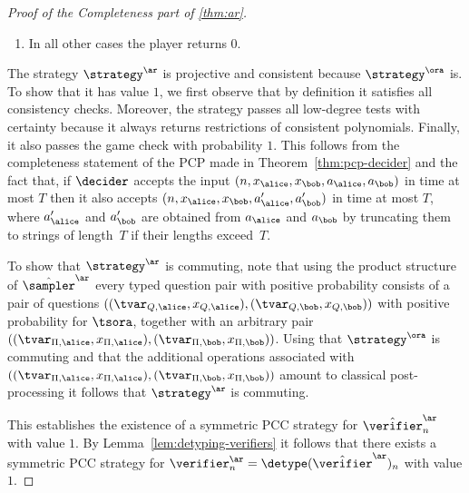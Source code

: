 \begin{proof}[Proof of the Completeness part of \cref{thm:ar}]
\begin{enumerate}
\begin{enumerate}
\begin{enumerate}
        $\DLine_i$ instead of $\ALine_i$) for $i \in \{1, \dots, 5\}$, the
        player returns the restriction of $g_i$ to the axis-parallel line (resp.
        diagonal line) of $\F_q^{m}$ specified by $x_\Pi$.
      \item If $\tvar_\Pi \in \{\Point_6, \ALine_6\}$ (resp.
        $\DLine_6$ instead of $\ALine_6$), the player returns the restriction of
        all the polynomials $g_1, \dots, g_5,$ $c_0, \dots, c_{m'}$ to the
        axis-parallel line of $\F_q^{m'}$ (resp.
        the diagonal line) specified by $x_\Pi$.
      \end{enumerate}
    \item In all other cases the player returns $0$.
    \end{enumerate}
  \end{enumerate}
  The strategy $\strategy^\ar$ is projective and consistent because $\strategy^\ora$
  is.
  To show that it has value $1$, we first observe that by definition it
  satisfies all consistency checks.
  Moreover, the strategy passes all low-degree tests with certainty because it
  always returns restrictions of consistent polynomials.
  Finally, it also passes the game check with probability $1$.
  This follows from the completeness statement of the PCP made in
  Theorem~\ref{thm:pcp-decider} and the fact that, if $\decider$ accepts the
  input $(n, x_\alice,x_\bob, a_\alice,a_\bob)$ in time at most $T$ then it also
  accepts $(n, x_\alice,x_\bob, a'_\alice,a'_\bob)$ in time at most $T$, where
  $a'_\alice$ and $a'_\bob$ are obtained from $a_\alice$ and $a_\bob$ by
  truncating them to strings of length~$T$ if their lengths exceed~$T$.

	To show that $\strategy^\ar$ is commuting, note that using the product structure
  of $\tsans$ every typed question pair with positive probability consists
  of a pair of questions $((\tvar_{Q,\alice},x_{Q, \alice}),(\tvar_{Q,\bob},
  x_{Q,\bob})) $ with positive probability for $\tsora$, together with an
  arbitrary pair $((\tvar_{\Pi,\alice},x_{\Pi, \alice}),
  (\tvar_{\Pi,\bob}, x_{\Pi,\bob}))$.
  Using that $\strategy^\ora$ is commuting and that the additional operations
  associated with $((\tvar_{\Pi,\alice},x_{\Pi, \alice}),
  (\tvar_{\Pi,\bob}, x_{\Pi,\bob}))$ amount to classical post-processing it
  follows that $\strategy^\ar$ is commuting.

  This establishes the existence of a symmetric PCC strategy for
  $\tvans_n$ with value $1$.
	By Lemma~\ref{lem:detyping-verifiers} it follows that there exists a symmetric
  PCC strategy for $\vans_n = \detype(\tvans)_n$ with value $1$.

\qedhere

\end{proof}

